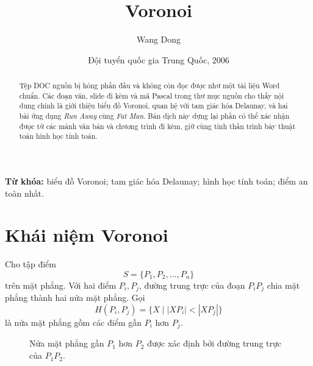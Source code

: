 \documentclass[11pt]{article}
\title{Voronoi}
\author{Wang Dong}
\date{Đội tuyển quốc gia Trung Quốc, 2006}
\begin{document}
\renewcommand{\figurename}{Hình}
\maketitle


\renewcommand{\abstractname}{Tóm tắt}
\begin{abstract}
Tệp DOC nguồn bị hỏng phần đầu và không còn đọc được như một tài liệu Word
chuẩn. Các đoạn văn, slide đi kèm và mã Pascal trong thư mục nguồn cho thấy
nội dung chính là giới thiệu biểu đồ Voronoi, quan hệ với tam giác hóa
Delaunay, và hai bài ứng dụng \textit{Run Away} cùng \textit{Fat Man}. Bản
dịch này dựng lại phần có thể xác nhận được từ các mảnh văn bản và chương
trình đi kèm, giữ cùng tinh thần trình bày thuật toán hình học tính toán.
\end{abstract}

\noindent\textbf{Từ khóa:} biểu đồ Voronoi; tam giác hóa Delaunay; hình học
tính toán; điểm an toàn nhất.

\section{Khái niệm Voronoi}

Cho tập điểm
\[
  S=\{P_1,P_2,\ldots,P_n\}
\]
trên mặt phẳng. Với hai điểm \(P_i,P_j\), đường trung trực của đoạn
\(P_iP_j\) chia mặt phẳng thành hai nửa mặt phẳng. Gọi
\[
  H(P_i,P_j)=\{X\mid |XP_i|<|XP_j|\}
\]
là nửa mặt phẳng gồm các điểm gần \(P_i\) hơn \(P_j\).

\begin{figure}[ht]
\centering
{}
\caption{Nửa mặt phẳng gần \(P_1\) hơn \(P_2\) được xác định bởi đường trung trực của \(P_1P_2\).}
\end{figure}
\end{document}
